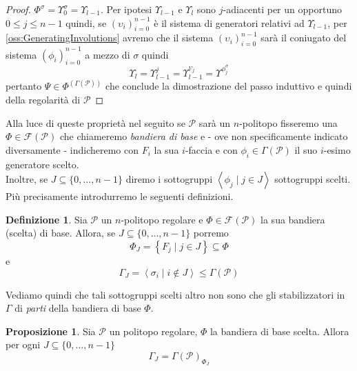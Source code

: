 \documentclass[a4paper,12pt]{report}
\newcommand{\p}{\mathcal{P}}
\theoremstyle{plain}
\theoremstyle{definition}
\newtheorem{defin}[teo]{Definizione}
\newtheorem{prop}[teo]{Proposizione}
\newcommand\flag[1]{\mathcal{F}(#1)}
\begin{document}
\begin{proof}
$\Phi^\sigma=\Upsilon_0^\sigma=\Upsilon_{l-1}$. Per ipotesi $\Upsilon_{l-1}$ e $\Upsilon_l$ sono $j$-adiacenti per un opportuno
$0\leq j\leq n-1$ quindi, se $(\upsilon_i)_{i=0}^{n-1}$ \`e il sistema di generatori relativi ad $\Upsilon_{l-1}$, per \ref{oss:GeneratingInvolutions}
 avremo che il sistema $(\upsilon_i)_{i=0}^{n-1}$ sar\`a il coniugato del sistema $(\phi_i)_{i=0}^{n-1}$ a mezzo di $\sigma$ quindi
\begin{equation*}
\Upsilon_l=\Upsilon_{l-1}^j=\Upsilon_{l-1}^{\upsilon_j}=\Upsilon^{\phi_j^\sigma}
\end{equation*}
pertanto $\Psi\in\Phi^(\Gamma(\p))$ che conclude la dimostrazione del passo induttivo e quindi della regolarit\`a di $\p$
\end{proof}

Alla luce di queste propriet\`a nel seguito se $\p$ sar\`a un $n$-politopo fisseremo una $\Phi\in\flag{\p}$ che chiameremo \emph{bandiera di base}
e - ove non specificamente indicato diversamente - indicheremo con $F_i$ la sua $i$-faccia e con $\phi_i\in\Gamma(\p)$ il suo $i$-esimo generatore
scelto.\\
Inoltre, se $J\subseteq\{0,\dots,n-1\}$ diremo i sottogruppi $\left\langle \phi_j\mid j\in J\right\rangle$ sottogruppi scelti. Pi\`u precisamente
 introdurremo le seguenti definizioni.
\begin{defin}
Sia $\p$ un $n$-politopo regolare e $\Phi\in\flag{\p}$ la sua bandiera (scelta) di base. Allora, se $J\subseteq\{0,\dots,n-1\}$ porremo
\begin{equation*}
\Phi_J=\left\{F_j\mid j\in J\right\}\subseteq\Phi
\end{equation*}
e
\begin{equation*}
\Gamma_J=\left\langle \sigma_i\mid i\notin J\right\rangle\leq \Gamma(\p)
\end{equation*}
\end{defin}
Vediamo quindi che tali sottogruppi scelti altro non sono che gli stabilizzatori in $\Gamma$ di \emph{parti} della bandiera di base $\Phi$.
\begin{prop}
\label{prop:DistSubgroups}
Sia $\p$ un politopo regolare, $\Phi$ la bandiera di base scelta. Allora per ogni $J\subseteq\{0,\dots,n-1\}$
\begin{equation*}
\Gamma_J=\Gamma(\p)_{\Phi_J}
\end{equation*}
\end{prop}
\end{document}
